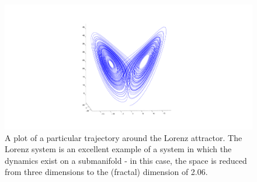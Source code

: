 \begin{figure}[h]
\centerline{
\includegraphics[scale=0.5	]{Figs/LorenzAttractor}}
\caption{A plot of a particular trajectory around the Lorenz attractor. The Lorenz system is an excellent example of a system in which the dynamics exist on a submanifold - in this case, the space is reduced from three dimensions to the (fractal) dimension of 2.06. }\label{fig:LorenzAttractor}
\end{figure}

